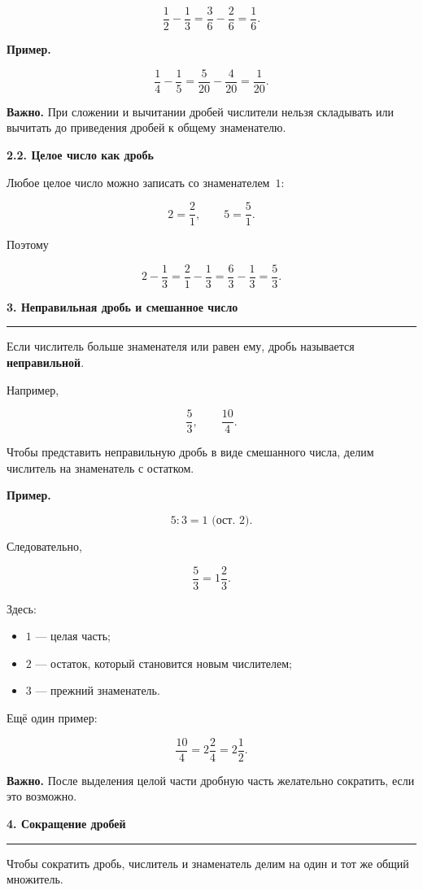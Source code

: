 \documentclass[a4paper,12pt]{article}
\newcommand{\topic}[1]{%
  \vspace{0.7em}
  {\Large\bfseries\color{darkaccent}#1}\par
  \vspace{0.25em}
  {\color{accent}\rule{\linewidth}{0.5pt}}
  \vspace{0.55em}
}
\newcommand{\subtopic}[1]{%
  \vspace{0.4em}
  {\large\bfseries\color{darkaccent}#1}\par
  \vspace{0.15em}
}
\newcommand{\important}[1]{%
  \par
  \vspace{0.25em}
  \noindent
  \textcolor{darkaccent}{\textbf{Важно.}} #1
  \par
}
\newcommand{\exampletitle}{%
  \par
  \vspace{0.3em}
  \noindent
  \textcolor{accent}{\textbf{Пример.}}\enspace
}
\begin{document}
\[
\frac12-\frac13
=
\frac36-\frac26
=
\frac16.
\]

\exampletitle

\[
\frac14-\frac15
=
\frac5{20}-\frac4{20}
=
\frac1{20}.
\]

\important{
При сложении и вычитании дробей числители нельзя складывать или
вычитать до приведения дробей к общему знаменателю.
}

\subtopic{2.2. Целое число как дробь}

Любое целое число можно записать со знаменателем~$1$:

\[
2=\frac21,\qquad
5=\frac51.
\]

Поэтому

\[
2-\frac13
=
\frac21-\frac13
=
\frac63-\frac13
=
\frac53.
\]

\topic{3. Неправильная дробь и смешанное число}

Если числитель больше знаменателя или равен ему, дробь называется
\textbf{неправильной}.

Например,

\[
\frac53,\qquad \frac{10}{4}.
\]

Чтобы представить неправильную дробь в виде смешанного числа,
делим числитель на знаменатель с остатком.

\exampletitle

\[
5:3=1\text{ (ост. }2\text{)}.
\]

Следовательно,

\[
\frac53=1\frac23.
\]

Здесь:

\begin{itemize}
  \item $1$ --- целая часть;
  \item $2$ --- остаток, который становится новым числителем;
  \item $3$ --- прежний знаменатель.
\end{itemize}

Ещё один пример:

\[
\frac{10}{4}=2\frac24=2\frac12.
\]

\important{
После выделения целой части дробную часть желательно сократить,
если это возможно.
}

\topic{4. Сокращение дробей}

Чтобы сократить дробь, числитель и знаменатель делим на один и тот же
общий множитель.
\end{document}
